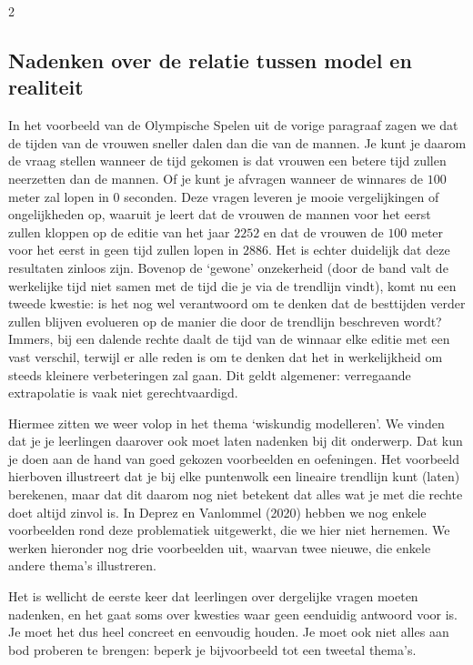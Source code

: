 \begin{multicols}{2}
    \subsection{Nadenken over de relatie tussen model en realiteit} \label{subsection:model en realiteit}

In het voorbeeld van de Olympische Spelen uit de vorige paragraaf zagen we dat de tijden van de vrouwen sneller dalen dan die van de mannen. Je kunt je daarom de vraag stellen wanneer de tijd gekomen is dat vrouwen een betere tijd zullen neerzetten dan de mannen. Of je kunt je afvragen wanneer de winnares de $100$ meter zal lopen in $0$ seconden. Deze vragen leveren je mooie vergelijkingen of ongelijkheden op, waaruit je leert dat de vrouwen de mannen voor het eerst zullen kloppen op de editie van het jaar $2252$ en dat de vrouwen de $100$ meter voor het eerst in geen tijd zullen lopen in $2886$. Het is echter duidelijk dat deze resultaten zinloos zijn. Bovenop de ‘gewone’ onzekerheid (door de band valt de werkelijke tijd niet samen met de tijd die je via de trendlijn vindt), komt nu een tweede kwestie: is het nog wel verantwoord om te denken dat de besttijden verder zullen blijven evolueren op de manier die door de trendlijn beschreven wordt? Immers, bij een dalende rechte daalt de tijd van de winnaar elke editie met een vast verschil, terwijl er alle reden is om te denken dat het in werkelijkheid om steeds kleinere verbeteringen zal gaan. Dit geldt algemener: verregaande extrapolatie is vaak niet gerechtvaardigd.

Hiermee zitten we weer volop in het thema ‘wiskundig modelleren’. We vinden dat je je leerlingen daarover ook moet laten nadenken bij dit onderwerp. Dat kun je doen aan de hand van goed gekozen voorbeelden en oefeningen. Het voorbeeld hierboven illustreert dat je bij elke puntenwolk een lineaire trendlijn kunt (laten) berekenen, maar dat dit daarom nog niet betekent dat alles wat je met die rechte doet altijd zinvol is. In Deprez en Vanlommel (2020) hebben we nog enkele voorbeelden rond deze problematiek uitgewerkt, die we hier niet hernemen. We werken hieronder nog drie voorbeelden uit, waarvan twee nieuwe, die enkele andere thema’s illustreren.

Het is wellicht de eerste keer dat leerlingen over dergelijke vragen moeten nadenken, en het gaat soms over kwesties waar geen eenduidig antwoord voor is. Je moet het dus heel concreet en eenvoudig houden. Je moet ook niet alles aan bod proberen te brengen: beperk je bijvoorbeeld tot een tweetal thema’s.


\end{multicols}

